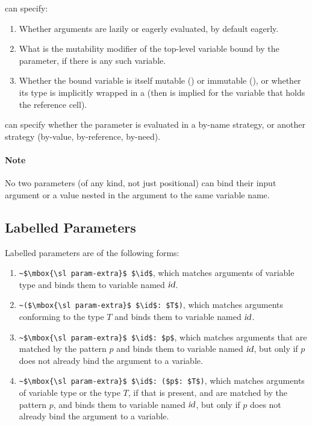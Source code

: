  can specify:
\begin{enumerate}
  \item Whether arguments are lazily or eagerly evaluated, by default eagerly. 
  \item What is the mutability modifier of the top-level variable bound by the parameter, if there is any such variable. 
  \item Whether the bound variable is itself mutable () or immutable (), or whether its type is implicitly wrapped in a  (then  is implied for the variable that holds the reference cell). 
\end{enumerate}

 can specify whether the parameter is evaluated in a by-name strategy, or another strategy (by-value, by-reference, by-need). 

\paragraph{Note}
No two parameters (of any kind, not just positional) can bind their input argument or a value nested in the argument to the same variable name. 





\subsection{Labelled Parameters}
\label{sec:labelled-parameters}

Labelled parameters are of the following forms:
\begin{enumerate}
  \item \lstinline!~$\mbox{\sl param-extra}$ $\id$!, which matches arguments of variable type and binds them to variable named $\mbox{\sl id}$. 
  \item \lstinline!~($\mbox{\sl param-extra}$ $\id$: $T$)!, which matches arguments conforming to the type $T$ and binds them to variable named $\mbox{\sl id}$. 
  \item \lstinline!~$\mbox{\sl param-extra}$ $\id$: $p$!, which matches arguments that are matched by the pattern $p$ and binds them to variable named $\mbox{\sl id}$, but only if $p$ does not already bind the argument to a variable. 
  \item \lstinline!~$\mbox{\sl param-extra}$ $\id$: ($p$: $T$)!, which matches arguments of variable type or the type $T$, if that is present, and are matched by the pattern $p$, and binds them to variable named $\mbox{\sl id}$, but only if $p$ does not already bind the argument to a variable. 
\end{enumerate}

